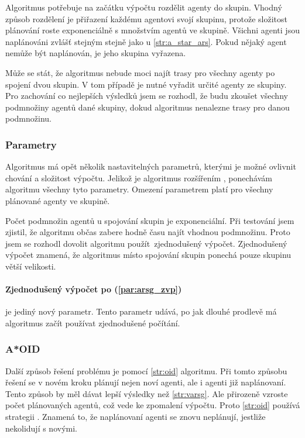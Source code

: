 Algoritmus potřebuje na začátku výpočtu rozdělit agenty do skupin.
Vhodný způsob rozdělení je přiřazení každému agentovi svojí skupinu,
protože složitost plánování roste exponenciálně s množstvím agentů ve skupině.
Všichni agenti jsou naplánováni zvlášť stejným stejně jako u \ref{str:a_star_ars}.
Pokud nějaký agent nemůže být naplánován, je jeho skupina vyřazena.

Může se stát, že algoritmus nebude moci najít trasy pro všechny agenty po spojení dvou skupin.
V tom případě je nutné vyřadit určité agenty ze skupiny.
Pro zachování co nejlepších výsledků jsem se rozhodl, že budu zkoušet všechny podmnožiny agentů dané skupiny,
dokud algoritmus nenalezne trasy pro danou podmnožinu.

\subsubsection{Parametry}\label{subsubsec:arsg_parametry}
Algoritmus má opět několik nastavitelných parametrů, kterými je možné ovlivnit chování a složitost výpočtu.
Jelikož je algoritmus rozšířením , ponechávám algoritmu všechny tyto parametry.
Omezení parametrem platí pro všechny plánované agenty ve skupině.

Počet podmnožin agentů u spojování skupin je exponenciální.
Při testování jsem zjistil, že algoritmu občas zabere hodně času najít vhodnou podmnožinu.
Proto jsem se rozhodl dovolit algoritmu použít\ zjednodušený výpočet.
Zjednodušený výpočet znamená, že algoritmus místo spojování skupin ponechá pouze skupinu větší velikosti.

\paragraph{Zjednodušený výpočet po (\ref{par:arsg_zvp})} je jediný nový parametr.
Tento parametr udává, po jak dlouhé prodlevě má algoritmus začít používat zjednodušené počítání.

\subsubsection{A*OID}\label{subsubsec:a_star_aoid}
Další způsob řešení  problému je pomocí \ref{str:oid} algoritmu.
Při tomto způsobu řešení se v novém kroku plánují nejen noví agenti, ale i agenti již naplánovaní.
Tento způsob by měl dávat lepší výsledky než \ref{str:varsg}.
Ale přirozeně vzroste počet plánovaných agentů, což vede ke zpomalení výpočtu.
Proto \ref{str:oid} používá strategii .
Znamená to, že naplánovaní agenti se znovu neplánují, jestliže nekolidují s novými.

